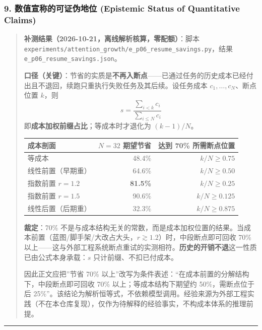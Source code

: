 \subsubsection{9. 数值宣称的可证伪地位 (Epistemic Status of Quantitative
Claims)}\label{ux6570ux503cux5ba3ux79f0ux7684ux53efux8bc1ux4f2aux5730ux4f4d-epistemic-status-of-quantitative-claims-1}

\begin{quote}
\textbf{补测结果（2026-10-21，离线解析核算，零配额）}：脚本
\texttt{experiments/attention\_growth/e\_p06\_resume\_savings.py}，结果
\texttt{e\_p06\_resume\_savings.json}。

\textbf{口径（关键）}：节省的实质是\textbf{不再入断点}------已通过任务的历史成本已经付出且不退回，续跑只重执行失败任务及其后续。设任务成本
\(c_1,\dots,c_N\)、断点位置 \(k\)，则
\[s=\frac{\sum_{i<k}c_i}{\sum_{i\le N}c_i}\]
即\textbf{成本加权前缀占比}；等成本时才退化为 \((k-1)/N\)。

{\def\LTcaptype{} %
\begin{longtable}[]{@{}lrr@{}}
\toprule\noalign{}
成本剖面 & \(N=32\) 期望节省 & 达到 70\% 所需断点位置 \\
\midrule\noalign{}
\endhead
\bottomrule\noalign{}
\endlastfoot
等成本 & 48.4\% & \(k/N\ge0.75\) \\
线性前置（早期重） & 64.6\% & \(k/N\ge0.50\) \\
指数前置 \(r=1.2\) & \textbf{81.5\%} & \(k/N\ge0.25\) \\
指数前置 \(r=1.5\) & 90.6\% & \(k/N\ge0.125\) \\
线性后置（后期重） & 32.3\% & \(k/N\ge0.875\) \\
\end{longtable}
}

\textbf{裁定}：70\%
不是与成本结构无关的常数，而是成本加权位置的结果。当成本前置（蓝图/脚手架/大改占大头，\(r\gtrsim1.2\)）时，中段断点即可回收
70\%
以上------这与外部工程系统断点重试的实测相符。\textbf{历史的开销不退}这一性质已由公式本身承载：\(s\)
只计前缀、不扣已付成本。

因此正文应把''节省 70\%
以上''改写为条件表述：``在成本前置的分解结构下，中段断点即可回收 70\%
以上；等成本结构下期望约 50\%，需断点位于后
25\%''。该结论为解析恒等式，不依赖模型调用。经验来源为外部工程实践（不在本仓库复现），仅作为待解释的经验事实，不构成本体系的推理前提。
\end{quote}

\begin{center}\rule{0.5\linewidth}{0.5pt}\end{center}

